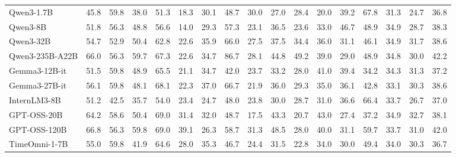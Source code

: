 \documentclass{article}
\theoremstyle{plain}
\theoremstyle{definition}
\theoremstyle{remark}
\theoremstyle{plain}
\begin{document}
\begin{table}[t]
{\begin{tabular}{l|cccc|ccccccc|cc|cc|c}
\rowcolor{green!10}
Qwen3-1.7B  & 45.8 & 59.8 & 38.0 & 51.3 & 18.3 & 30.1 & 48.7 & 30.0 & 27.0 & 28.4 & 20.0 & 39.2 & 67.8 & 31.3 & 24.7 & 36.8 \\
\rowcolor{green!10}
Qwen3-8B & 51.8 & 56.3 & 48.8 & 56.6 & 14.0 & 29.3 & 57.3 & 23.1 & 36.5 & 23.6 & 33.0 & 46.7 & 48.9 & 34.9 & 28.7 & 38.3 \\
\rowcolor{green!10}
Qwen3-32B & 54.7 & 52.9 & 50.4 & 62.8 & 22.6 & 35.9 & 66.0 & 27.5 & 37.5 & 34.4 & 36.0 & 31.1 & 46.1 & 34.9 & 31.7 & 38.6 \\
\rowcolor{green!10}
Qwen3-235B-A22B & 66.0 & 56.3 & 59.7 & 67.3 & 22.6 & 34.7 & 86.7 & 28.1 & 44.8 & 49.2 & 39.0 & 29.0 & 48.9 & 34.8 & 30.0 & 42.2 \\
\rowcolor{green!10}
Gemma3-12B-it & 51.5 & 59.8 & 48.9 & 65.5 & 21.1 & 34.7 & 42.0 & 23.7 & 33.2 & 28.0 & 41.0 & 39.4 & 34.2 & 34.3 & 31.3 & 37.2\\
\rowcolor{green!10}
Gemma3-27B-it & 56.1 & 59.8 & 48.1 & 68.1 & 22.3 & 37.0 & 66.7 & 21.9 & 36.0 & 29.3 & 35.0 & 36.1 & 42.8 & 33.1 & 30.3 & 38.6\\
\rowcolor{green!10}
InternLM3-8B & 51.2 & 42.5 & 35.7 & 54.0 & 23.4 & 24.7 & 48.0 & 23.8 & 30.0 & 28.7 & 31.0 & 36.6 & 66.4 & 33.7 & 26.7 & 37.0 \\
\rowcolor{green!10}
GPT-OSS-20B & 64.2 & 58.6 & 50.4 & 69.0 & 31.4 & 32.0 & 48.7 & 17.5 & 43.3 & 20.7 & 43.0 & 27.4 & 37.2 & 34.9 & 32.7 & 38.1\\
\rowcolor{green!10}
GPT-OSS-120B & 66.8 & 56.3 & 59.8 & 69.0 & 39.1 & 26.3 & 58.7 & 31.3 & 48.5 & 28.0 & 40.0 & 31.1 & 59.7 & 33.7 & 31.0 & 42.0\\
\rowcolor{green!10}
TimeOmni-1-7B & 55.0 & 59.8 & 41.9 &64.6 & 28.0 & 35.3 & 46.7 & 24.4 & 31.5 & 22.8 & 34.0 & 30.0 & 49.4 &34.0 & 30.3 & 36.7 \\


\end{tabular}}
\end{table}
\end{document}
